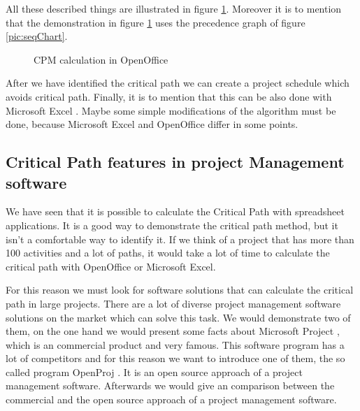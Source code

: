 All these described things are illustrated in figure \ref{pic:office}. Moreover it is to mention that the demonstration in figure \ref{pic:office} uses the precedence graph of figure \ref{pic:seqChart}.
\begin{figure}[h] 
\centerline{}
\caption{CPM calculation in OpenOffice}
\label{pic:office}
\end{figure}


After we have identified the critical path we can create a project schedule which avoids critical path. Finally, it is to mention that this can be also done with Microsoft Excel \cite{exc}. Maybe some simple modifications of the algorithm must be done, because Microsoft Excel \cite{exc} and OpenOffice \cite{oo} differ in some points.

\subsection{Critical Path features in project Management software}
We have seen that it is possible to calculate the Critical Path with spreadsheet applications. It is a good way to demonstrate the critical path method, but it isn't a comfortable way to identify it. If we think of a project that has more than 100 activities and a lot of paths, it would take a lot of time to calculate the critical path with OpenOffice or Microsoft Excel. 

For this reason we must look for software solutions that can calculate the critical path in large projects. There are a lot of diverse project management software solutions on the market which can solve this task. We would demonstrate two of them, on the one hand we would present some facts about Microsoft Project \cite{msp}, which is an commercial product and very famous. This software program has a lot of competitors and for this reason we want to introduce one of them, the so called program OpenProj \cite{opr}. It is an open source approach of a project management software. Afterwards we would give an comparison between the commercial and the open source approach of a project management software.

